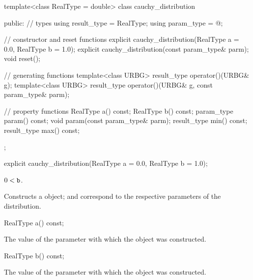 %
\begin{codeblock}
template<class RealType = double>
  class cauchy_distribution {
  public:
    // types
    using result_type = RealType;
    using param_type  = @\unspec@;

    // constructor and reset functions
    explicit cauchy_distribution(RealType a = 0.0, RealType b = 1.0);
    explicit cauchy_distribution(const param_type& parm);
    void reset();

    // generating functions
    template<class URBG>
      result_type operator()(URBG& g);
    template<class URBG>
      result_type operator()(URBG& g, const param_type& parm);

    // property functions
    RealType a() const;
    RealType b() const;
    param_type param() const;
    void param(const param_type& parm);
    result_type min() const;
    result_type max() const;
  };
\end{codeblock}


%
\begin{itemdecl}
explicit cauchy_distribution(RealType a = 0.0, RealType b = 1.0);
\end{itemdecl}

\begin{itemdescr}
\pnum\requires
 $ 0 < \texttt{\protect b} $.

\pnum\effects Constructs a  object;
  and 
 correspond to the respective parameters of the distribution.
\end{itemdescr}

%
\begin{itemdecl}
RealType a() const;
\end{itemdecl}

\begin{itemdescr}
\pnum\returns The value of the  parameter
 with which the object was constructed.
\end{itemdescr}

%
\begin{itemdecl}
RealType b() const;
\end{itemdecl}

\begin{itemdescr}
\pnum\returns The value of the  parameter
 with which the object was constructed.
\end{itemdescr}

